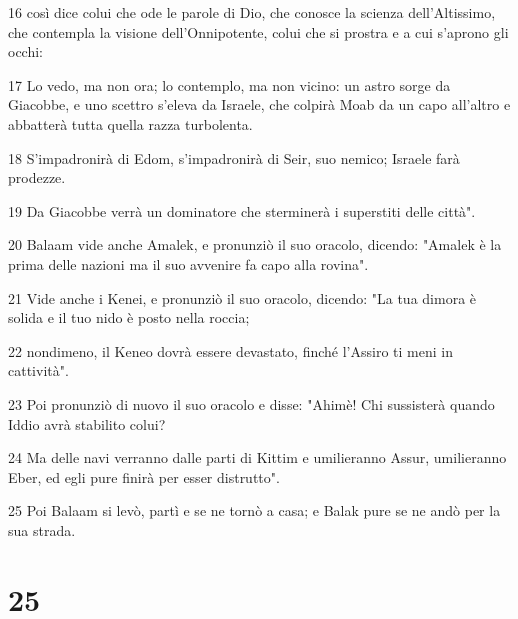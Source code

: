 \par 16 così dice colui che ode le parole di Dio, che conosce la scienza dell'Altissimo, che contempla la visione dell'Onnipotente, colui che si prostra e a cui s'aprono gli occhi:
\par 17 Lo vedo, ma non ora; lo contemplo, ma non vicino: un astro sorge da Giacobbe, e uno scettro s'eleva da Israele, che colpirà Moab da un capo all'altro e abbatterà tutta quella razza turbolenta.
\par 18 S'impadronirà di Edom, s'impadronirà di Seir, suo nemico; Israele farà prodezze.
\par 19 Da Giacobbe verrà un dominatore che sterminerà i superstiti delle città".
\par 20 Balaam vide anche Amalek, e pronunziò il suo oracolo, dicendo: "Amalek è la prima delle nazioni ma il suo avvenire fa capo alla rovina".
\par 21 Vide anche i Kenei, e pronunziò il suo oracolo, dicendo: "La tua dimora è solida e il tuo nido è posto nella roccia;
\par 22 nondimeno, il Keneo dovrà essere devastato, finché l'Assiro ti meni in cattività".
\par 23 Poi pronunziò di nuovo il suo oracolo e disse: "Ahimè! Chi sussisterà quando Iddio avrà stabilito colui?
\par 24 Ma delle navi verranno dalle parti di Kittim e umilieranno Assur, umilieranno Eber, ed egli pure finirà per esser distrutto".
\par 25 Poi Balaam si levò, partì e se ne tornò a casa; e Balak pure se ne andò per la sua strada.

\chapter{25}


